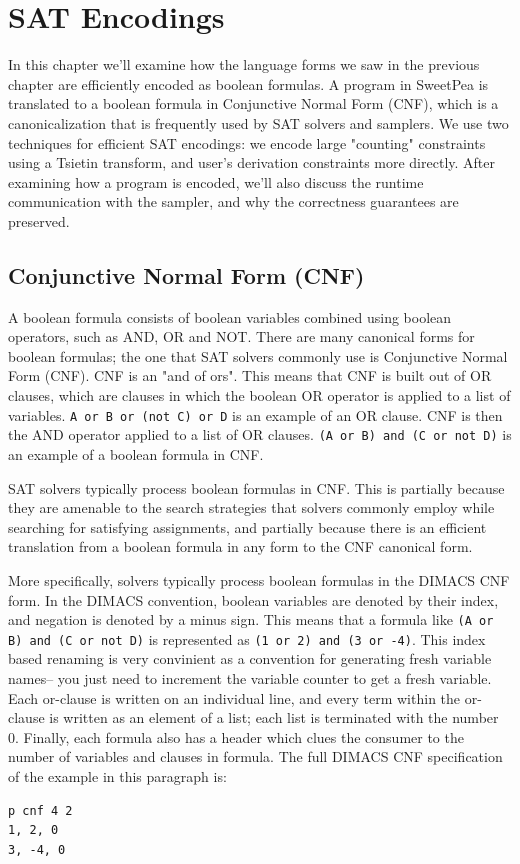 
\chapter{SAT Encodings}

In this chapter we'll examine how the language forms we saw in the previous chapter are efficiently encoded as boolean formulas. A program in SweetPea is translated to a boolean formula in Conjunctive Normal Form (CNF), which is a canonicalization that is frequently used by SAT solvers and samplers. We use two techniques for efficient SAT encodings: we encode large "counting" constraints using a Tsietin transform, and user's derivation constraints more directly. After examining how a program is encoded, we'll also discuss the runtime communication with the sampler, and why the correctness guarantees are preserved.

\section{Conjunctive Normal Form (CNF)}

A boolean formula consists of boolean variables combined using boolean operators, such as AND, OR and NOT. There are many canonical forms for boolean formulas; the one that SAT solvers commonly use is Conjunctive Normal Form (CNF). CNF is an "and of ors". This means that CNF is built out of OR clauses, which are clauses in which the boolean OR operator is applied to a list of variables. \texttt{A or B or (not C) or D} is an example of an OR clause. CNF is then the AND operator applied to a list of OR clauses. \texttt{(A or B) and (C or not D)} is an example of a boolean formula in CNF.

SAT solvers typically process boolean formulas in CNF. This is partially because they are amenable to the search strategies that solvers commonly employ while searching for satisfying assignments, and partially because there is an efficient translation from a boolean formula in any form to the CNF canonical form.

More specifically, solvers typically process boolean formulas in the DIMACS CNF form. In the DIMACS convention, boolean variables are denoted by their index, and negation is denoted by a minus sign. This means that a formula like \texttt{(A or B) and (C or not D)} is represented as \texttt{(1 or 2) and (3 or -4)}. This index based renaming is very convinient as a convention for generating fresh variable names-- you just need to increment the variable counter to get a fresh variable. Each or-clause is written on an individual line, and every term within the or-clause is written as an element of a list; each list is terminated with the number 0. Finally, each formula also has a header which clues the consumer to the number of variables and clauses in formula. The full DIMACS CNF specification of the example in this paragraph is:
\begin{verbatim}
p cnf 4 2
1, 2, 0
3, -4, 0
\end{verbatim}

